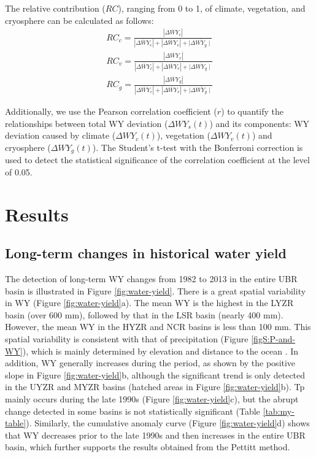 \documentclass[hess, manuscript]{copernicus}
\begin{document}
The relative contribution ($RC$), ranging from 0 to 1, of climate, vegetation, and cryosphere can be calculated as follows:
\begin{equation}
    \begin{split}
        RC_{c}=\frac{\left|\overline{\Delta WY_{c}}\right|}{\left|\overline{\Delta WY_{c}}\right|+\left|\overline{\Delta WY_{v}}\right|+\mid \overline{\Delta WY_{g} \mid}}\\
        RC_{v}=\frac{\left|\overline{\Delta WY_{v}}\right|}{\left|\overline{\Delta WY_{c}}\right|+\left|\overline{\Delta WY_{v}}\right|+\mid \overline{\Delta WY_{g} \mid}}\\
        RC_{g}=\frac{\left|\overline{\Delta WY_{g}}\right|}{\left|\overline{\Delta WY_{c}}\right|+\left|\overline{\Delta WY_{v}}\right|+\mid \overline{\Delta WY_{g} \mid}}
    \end{split}
\end{equation}

Additionally, we use the Pearson correlation coefficient ($r$) to quantify the relationships between total WY deviation ($\Delta WY_s(t)$) and its components: WY deviation caused by climate ($\Delta WY_c(t)$), vegetation ($\Delta WY_v(t)$) and cryosphere ($\Delta WY_g(t)$). The Student's t-test with the Bonferroni correction \citep{bonferroni1935calcolo} is used to detect the statistical significance of the correlation coefficient at the level of 0.05.

\section{Results}
\subsection{Long-term changes in historical water yield}
The detection of long-term WY changes from 1982 to 2013 in the entire UBR basin is illustrated in Figure \ref{fig:water-yield}. There is a great spatial variability in WY (Figure \ref{fig:water-yield}a). The mean WY is the highest in the LYZR basin (over 600 mm), followed by that in the LSR basin (nearly 400 mm). However, the mean WY in the HYZR and NCR basins is less than 100 mm. This spatial variability is consistent with that of precipitation (Figure \ref{figS:P-and-WY}), which is mainly determined by elevation and distance to the ocean \citep{sang2016precipitation}. In addition, WY generally increases during the period, as shown by the positive slope in Figure \ref{fig:water-yield}b, although the significant trend is only detected in the UYZR and MYZR basins (hatched areas in Figure \ref{fig:water-yield}b). Tp mainly occurs during the late 1990s (Figure \ref{fig:water-yield}c), but the abrupt change detected in some basins is not statistically significant (Table \ref{tab:my-table}). Similarly, the cumulative anomaly curve (Figure \ref{fig:water-yield}d) shows that WY decreases prior to the late 1990s and then increases in the entire UBR basin, which further supports the results obtained from the Pettitt method.
\end{document}
